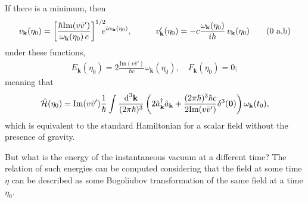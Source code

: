 If there is a minimum, then
\begin{subequations}
	\begin{gather}
		v_\mathbf{k}(\eta_0)=\left[\frac{\hbar\text{Im}(v\bar v')}{\omega_\mathbf{k}(\eta_0)\,c}\right]^{1/2}\!\!\!\!e^{i\alpha_\mathbf{k}(\eta_0)},\hspace{1.0cm}v'_\mathbf{k}(\eta_0)=-c\frac{\omega_\mathbf{k}(\eta_0)}{ih}\,v_\mathbf{k}(\eta_0)\tag{\theequation \,\,a,b}
	\end{gather}
\end{subequations}
under these functions,
\begin{subequations}
	\begin{gather}
		E_\mathbf{k}(\eta_0)=2\frac{\text{Im}(v\bar v')}{\hbar c}\omega_\mathbf{k}(\eta_0),\quad  F_\mathbf{k}(\eta_0)=0;
	\end{gather}
\end{subequations}
meaning that
\begin{equation}
	\hat{\mathcal{H}}(\eta_0)=\text{Im}(v\bar v')\frac{1}{\hbar}\int\frac{\text{d}^3\mathbf{k}}{(2\pi\hbar)^3}\left(2\hat{a}_\mathbf{k}^\dagger\hat{a}_\mathbf{k}+\frac{(2\pi\hbar)^3\hbar c}{2\text{Im}(v\bar v')}\delta^3(\mathbf{0})\right)\omega_\mathbf{k}(t_0),
\end{equation}
which is equivalent to the standard Hamiltonian for a scalar field without the presence of gravity.

\vspace*{0.5cm}

But what is the energy of the instantaneous vacuum at a different time? The relation of such energies can be computed considering that the field at some time $\eta$ can be described as some Bogoliubov transformation of the same field at a time $\eta_0$.

